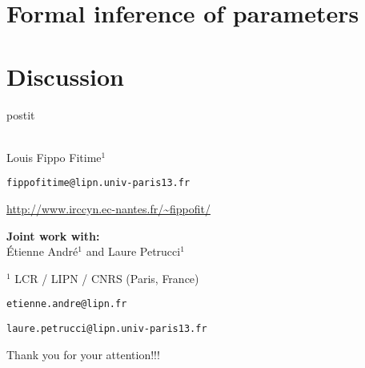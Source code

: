 \documentclass[fleqn,10pt,c]{beamer}
\begin{document}


\section{Formal inference of parameters}



\section{Discussion}




\begin{frame}[plain,label=title]

\begin{center}
\vspace{1cm}
\begin{beamercolorbox}[sep=0.5em]{postit}
\centering
\Large
\textbf{%
{\normalsize\theconference{}}\\~\\%
\inserttitle
}
\end{beamercolorbox}



\par
\medskip
\normalsize
Louis Fippo Fitime$^1$
\footnotesize

\texttt{fippofitime@lipn.univ-paris13.fr}

\url{http://www.irccyn.ec-nantes.fr/~fippofit/}



\bigskip
\textbf{Joint work with:} \\  \'Etienne Andr\'e$^1$ and Laure Petrucci$^1$


\medskip
\footnotesize
$^1$ LCR / LIPN / CNRS (Paris, France)

\texttt{etienne.andre@lipn.fr}

\texttt{laure.petrucci@lipn.univ-paris13.fr}


\end{center}

Thank you for your attention!!!

\end{frame}
\end{document}
